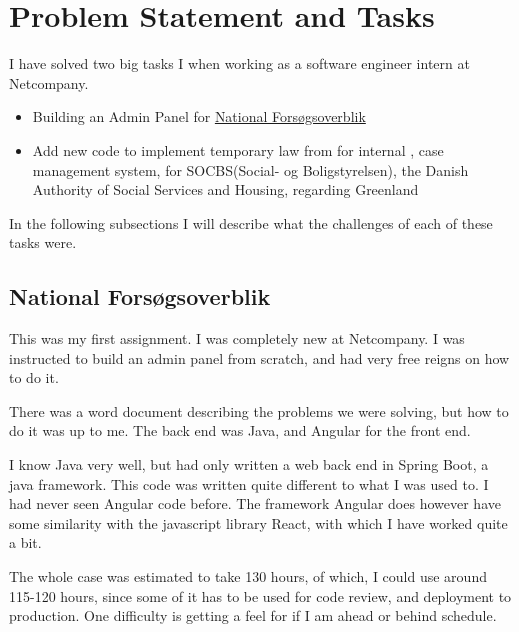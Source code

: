 \documentclass[../main.tex]{subfiles}
\begin{document}
\section{Problem Statement and Tasks}

I have solved two big tasks I when working as a software engineer intern at Netcompany. 

\begin{itemize}
    \item Building an Admin Panel for \href{https://nationaltforsoegsoverblik.dk/}{National Forsøgsoverblik} 
    \item Add new code to implement temporary law from  for internal , case management system, for SOCBS(Social- og Boligstyrelsen), the Danish Authority of Social Services and Housing, regarding Greenland
\end{itemize}

In the following subsections I will describe what the challenges of each of these tasks were. 

\subsection{National Forsøgsoverblik}

This was my first assignment. I was completely new at Netcompany. I was instructed to build an admin panel from scratch, and had very free reigns on how to do it. 

There was a word document describing the problems we were solving, but how to do it was up to me. The back end was Java, and Angular for the front end. 

I know Java very well, but had only written a web back end in Spring Boot, a java framework. This code was written quite different to what I was used to. I had never seen Angular code before. The framework Angular does however have some similarity with the javascript library React, with which I have worked quite a bit. 

The whole case was estimated to take 130 hours, of which, I could use around 115-120 hours, since some of it has to be used for code review, and deployment to production. One difficulty is getting a feel for if I am ahead or behind schedule. 
\end{document}
